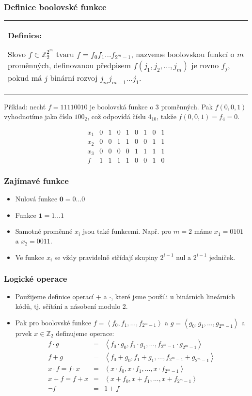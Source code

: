 \documentclass{beamer}
\newenvironment{definice}
{
    \begin{center}
    \begin{tabular}{p{9cm}}
    \textbf{Definice:}
}
{
    \end{tabular}
    \end{center}
}
\newcommand{\cela}{\mathbb{Z}}
\newcommand{\zero}{\textbf{0}}
\newcommand{\one}{\textbf{1}}
\newenvironment{itemizex}%
  {\large \begin{itemize}%
    \setlength{\itemsep}{8pt}%
    \setlength{\parskip}{8pt}}%
  {\end{itemize}}
\begin{document}
\begin{frame}[t,fragile]\frametitle{Definice boolovské funkce} 
\begin{definice}
Slovo $f\in\cela_2^{2^m}$ tvaru $f=f_0f_1\dots f_{2^m-1}$, nazveme boolovskou funkcí o $m$ proměnných, definovanou předpisem $f(j_1, j_2, \dots, j_m)$ je rovno $f_j$, pokud má $j$ binární rozvoj $j_mj_{m-1}\dots j_1$.
\end{definice}

Příklad: nechť $f=11110010$ je boolovská funkce o 3 proměnných. Pak $f(0,0,1)$ vyhodnotíme jako  číslo $100_2$, což odpovídá číslu $4_{10}$, takže $f(0,0,1)=f_4=0$.

$$
\begin{array}{l|cccccccc}
x_1&0&1&0&1&0&1&0&1\\
x_2&0&0&1&1&0&0&1&1\\
x_3&0&0&0&0&1&1&1&1\\\hline
f&1&1&1&1&0&0&1&0
\end{array}
$$
\end{frame}


\begin{frame}[t,fragile]\frametitle{Zajímavé funkce} 
    \begin{itemizex}
        \item Nulová funkce $\zero=0\dots0$
        \item Funkce $\one=1\dots1$
        \item Samotné proměnné $x_i$ jsou také funkcemi. Např. pro $m=2$ máme $x_1=0101$ a $x_2=0011$.
        \item Ve funkce $x_i$ se vždy pravidelně střídají skupiny $2^{i-1}$ nul a $2^{i-1}$ jedniček.
    \end{itemizex}
\end{frame}


\begin{frame}[t,fragile]\frametitle{Logické operace} 
    \begin{itemizex}
        \item Použijeme definice operací $+$ a $\cdot$, které jsme použili u binárních lineárních kódů, tj. sčítání a násobení modulo 2.
        \item Pak pro boolovské funkce $f=\left<f_0,f_1,\dots,f_{2^m-1}\right>$ a $g=\left<g_0,g_1,\dots, g_{2^m-1}\right>$ a prvek $x\in\cela_2$ definujeme operace:
        \begin{eqnarray*}
f\cdot g&=& \left<f_0\cdot g_0, f_1\cdot g_1,\dots, f_{2^m-1}\cdot g_{2^m-1}\right>\\
f+ g&=& \left<f_0+ g_0, f_1+ g_1,\dots, f_{2^m-1}+ g_{2^m-1}\right>\\
x\cdot f=f\cdot x&=& \left<x\cdot f_0, x\cdot f_1,\dots, x\cdot f_{2^m-1}\right>\\
x+f=f+x&=& \left<x+f_0, x+f_1,\dots, x+f_{2^m-1}\right>\\
\neg f&=& 1+f
        \end{eqnarray*}
    \end{itemizex}
\end{frame}
\end{document}
